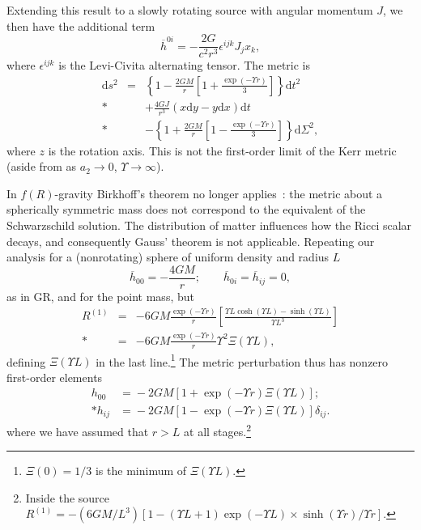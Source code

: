 \documentclass[aps,prd,amsfonts,amssymb,amsmath,nofootinbib,reprint,showpacs]{revtex4-1}
\newcommand{\dd}{\ensuremath{\text{d}}}
\begin{document}
Extending this result to a slowly rotating source with angular momentum $J$, we then have the additional term~\cite{Hobson2006}
\begin{equation}
\overline{h}^{0i} = -\frac{2G}{c^2r^3} \epsilon^{ijk}J_j x_k,
\end{equation}
where $\epsilon^{ijk}$ is the Levi-Civita alternating tensor. The metric is
\begin{eqnarray}
\dd s^2 & = & \left\{1-\frac{2GM}{r}\left[1 + \frac{\exp(- \Upsilon r)}{3}\right]\right\}\dd t^2 \nonumber \\*
& & + {} \frac{4GJ}{r^3}\left(x\dd y - y\dd x\right)\dd t \nonumber \\*
& & - {} \left\{1 +\frac{2GM}{r}\left[1 - \frac{\exp(- \Upsilon r)}{3}\right]\right\}\dd \Sigma^2,\label{eq:f(R)_Kerr}
\end{eqnarray}
where $z$ is the rotation axis. This is not the first-order limit of the Kerr metric (aside from as $a_2 \rightarrow 0$, $\Upsilon \rightarrow \infty$).

In $f(R)$-gravity Birkhoff's theorem no longer applies~\cite{Pechlaner1966, Stelle1978, Clifton2006, Capozziello2009b, Stabile2010}: the metric about a spherically symmetric mass does not correspond to the equivalent of the Schwarzschild solution. The distribution of matter influences how the Ricci scalar decays, and consequently Gauss' theorem is not applicable. Repeating our analysis for a (nonrotating) sphere of uniform density and radius $L$
\begin{equation}
\overline{h}_{00} = -\frac{4GM}{r}; \qquad \overline{h}_{0i} = \overline{h}_{ij} = 0,
\end{equation}
as in GR, and for the point mass, but
\begin{eqnarray}
R^{(1)} & = & -6 G M \frac{\exp(- \Upsilon r)}{r}\left[\frac{\Upsilon L\cosh(\Upsilon L) - \sinh(\Upsilon L)}{\Upsilon L^3}\right] \nonumber \\*
 & = &  -6 G M \frac{\exp(- \Upsilon r)}{r}\Upsilon^2\Xi(\Upsilon L),
\end{eqnarray}
defining $\Xi(\Upsilon L)$ in the last line.\footnote{$\Xi(0) = 1/3$ is the minimum of $\Xi(\Upsilon L)$.} The metric perturbation thus has nonzero first-order elements~\cite{Stelle1978, Capozziello2009b, Stabile2010}
\begin{equation}
\begin{split}
h_{00} & = {} -2 G M \left[1 + \exp(- \Upsilon r)\Xi(\Upsilon L)\right]; \\*
h_{ij} & = {} -2 G M \left[1 - \exp(- \Upsilon r)\Xi(\Upsilon L)\right]\delta_{ij}.
\label{eq:Uniform}
\end{split}
\end{equation}
where we have assumed that $r > L$ at all stages.\footnote{Inside the source $R^{(1)} = -{(6 G M/{L^3})}[1 - (\Upsilon L + 1)\exp(-\Upsilon L) \times\sinh(\Upsilon r)/\Upsilon r]$.}
\end{document}
